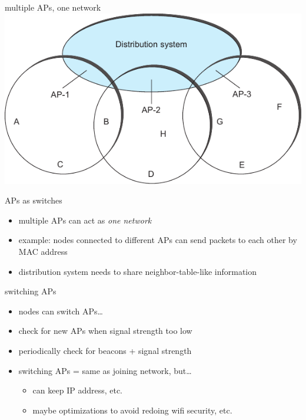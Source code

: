 \begin{frame}{multiple APs, one network}
\includegraphics[width=\textwidth]{../multiaccess/cnsp-fig48}
\end{frame}

\begin{frame}{APs as switches}
    \begin{itemize}
    \item multiple APs can act as \textit{one network}
    \item example: nodes connected to different APs can send packets to each other by MAC address
    \vspace{.5cm}
    \item distribution system needs to share neighbor-table-like information
    \end{itemize}
\end{frame}

\begin{frame}{switching APs}
    \begin{itemize}
    \item nodes can switch APs\ldots
    \vspace{.5cm}
    \item check for new APs when signal strength too low
    \item periodically check for beacons + signal strength
    \vspace{.5cm}
    \item switching APs = same as joining network, but\ldots
        \begin{itemize}
        \item can keep IP address, etc.
        \item maybe optimizations to avoid redoing wifi security, etc.
        \end{itemize}
    \end{itemize}
\end{frame}


